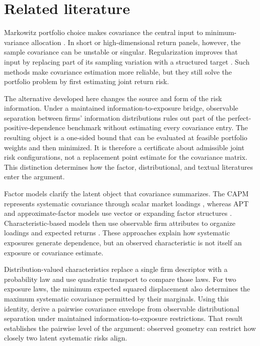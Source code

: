 \section{Related literature}\label{sec:literature}

Markowitz portfolio choice makes covariance the central input to
minimum-variance allocation \citep{markowitz_portfolio_1952}.
In short or high-dimensional return panels, however, the sample covariance
can be unstable or singular.
Regularization improves that input by replacing part of its sampling
variation with a structured target \citep{ledoit_wolf_2004}.
Such methods make covariance estimation more reliable, but they still solve
the portfolio problem by first estimating joint return risk.

The alternative developed here changes the source and form of the risk information.
Under a maintained information-to-exposure bridge, observable separation
between firms' information distributions rules out part of the
perfect-positive-dependence benchmark without estimating every covariance entry.
The resulting object is a one-sided bound that can be evaluated at feasible
portfolio weights and then minimized.
It is therefore a certificate about admissible joint risk configurations, not
a replacement point estimate for the covariance matrix.
This distinction determines how the factor, distributional, and textual
literatures enter the argument.

Factor models clarify the latent object that covariance summarizes.
The CAPM represents systematic covariance through scalar market loadings
\citep{sharpe_capital_1964}, whereas APT and approximate-factor models use
vector or expanding factor structures
\citep{ross_arbitrage_1976,chamberlain_rothschild_1983,bai_ng_2002}.
Characteristic-based models then use observable firm attributes to organize
loadings and expected returns
\citep{rosenberg1974extra,connor2007semiparametric,
connor2012efficient,kelly_characteristics_2019}.
These approaches explain how systematic exposures generate dependence, but an
observed characteristic is not itself an exposure or covariance estimate.

Distribution-valued characteristics replace a single firm descriptor with a
probability law and use quadratic transport to compare those laws.
For two exposure laws, the minimum expected squared displacement also
determines the maximum systematic covariance permitted by their marginals.
Using this identity, \citet{gawronsky_continuous_2026} derive a pairwise
covariance envelope from observable distributional separation under
maintained information-to-exposure restrictions.
That result establishes the pairwise level of the argument: observed geometry
can restrict how closely two latent systematic risks align.

